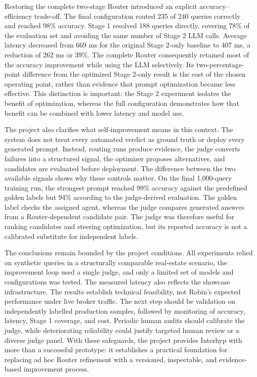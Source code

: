 Restoring the complete two-stage Router introduced an explicit accuracy--efficiency trade-off. The final configuration routed 235 of 240 queries correctly and reached 98\% accuracy. Stage 1 resolved 188 queries directly, covering 78\% of the evaluation set and avoiding the same number of Stage 2 LLM calls. Average latency decreased from 669 ms for the original Stage 2-only baseline to 407 ms, a reduction of 262 ms or 39\%. The complete Router consequently retained most of the accuracy improvement while using the LLM selectively. Its two-percentage-point difference from the optimized Stage 2-only result is the cost of the chosen operating point, rather than evidence that prompt optimization became less effective. This distinction is important: the Stage 2 experiment isolates the benefit of optimization, whereas the full configuration demonstrates how that benefit can be combined with lower latency and model use.

The project also clarifies what self-improvement means in this context. The system does not treat every automated verdict as ground truth or deploy every generated prompt. Instead, routing runs produce evidence, the judge converts failures into a structured signal, the optimizer proposes alternatives, and candidates are evaluated before deployment. The difference between the two available signals shows why these controls matter. On the final 1,000-query training run, the strongest prompt reached 99\% accuracy against the predefined golden labels but 94\% according to the judge-derived evaluation. The golden label checks the assigned agent, whereas the judge compares generated answers from a Router-dependent candidate pair. The judge was therefore useful for ranking candidates and steering optimization, but its reported accuracy is not a calibrated substitute for independent labels.

The conclusions remain bounded by the project conditions. All experiments relied on synthetic queries in a structurally comparable real-estate scenario, the improvement loop used a single judge, and only a limited set of models and configurations was tested. The measured latency also reflects the showcase infrastructure. The results establish technical feasibility, not Robin's expected performance under live broker traffic. The next step should be validation on independently labelled production samples, followed by monitoring of accuracy, latency, Stage 1 coverage, and cost. Periodic human audits should calibrate the judge, while deteriorating reliability could justify targeted human review or a diverse judge panel. With these safeguards, the project provides Interhyp with more than a successful prototype: it establishes a practical foundation for replacing ad hoc Router refinement with a versioned, inspectable, and evidence-based improvement process.
